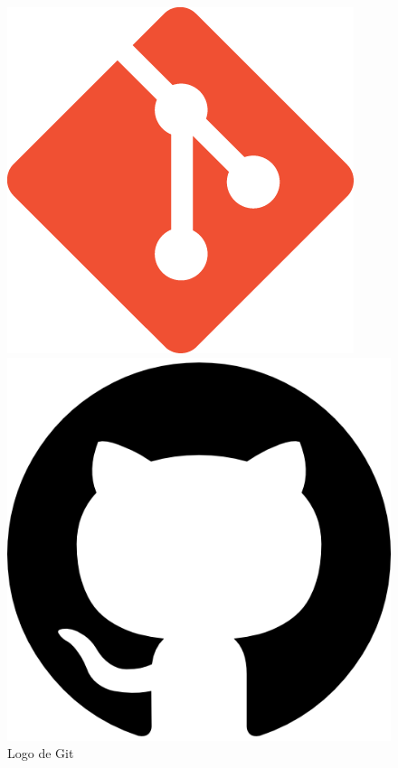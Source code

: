 \begin{figure}[H]
    \centering
    \begin{minipage}{0.2\textwidth}
        \centering
        \includegraphics[width=\textwidth]{figures/7-Construccion/Git.png}
        \caption{Logo de Git}
    \end{minipage}
    \hfill
    \begin{minipage}{0.2\textwidth}
        \centering
        \includegraphics[width=\textwidth]{figures/7-Construccion/Github.png}

\end{minipage}
\end{figure}
